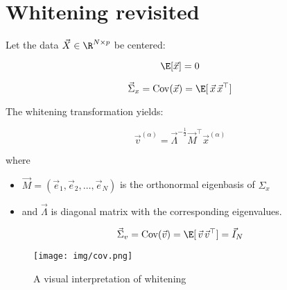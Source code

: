
\section{Whitening revisited}


\begin{frame}{\secname}


Let the data $\vec X \in \R^{N \times p}$ be centered:

\begin{equation}
\label{eq:centered}
\E \lbrack \vec x \rbrack = 0 
\end{equation}


\begin{equation}
\label{eq:cov}
\vec \Sigma_x = \mathrm{Cov}(\vec x) = \E \lbrack \, \vec x \, \vec x^\top \rbrack 
\end{equation}

The whitening transformation yields:

\begin{equation}
\label{eq:whitening}
\vec v^{(\alpha)} = \vec \Lambda^{-\frac{1}{2}} \vec M^\top \vec x^{(\alpha)}
\end{equation}

where
\begin{itemize}
\item[] $\vec M = (\vec e_1, \vec e_2, \ldots,\vec e_N)$ is the orthonormal eigenbasis of $\Sigma_x$
\item[] and $\vec\Lambda$ is diagonal matrix with the corresponding eigenvalues.
\end{itemize}

\pause


\pause


\svspace{-5mm}

\begin{equation}
\label{eq:covw}
\vec \Sigma_v = \mathrm{Cov}(\vec v) = \E \lbrack \, \vec v \, \vec v^\top \rbrack = \vec I_N
\end{equation}

\end{frame}

\begin{frame}{\secname}

\begin{figure}[ht]
\label{fig:sphering}
\texttt{[image: img/cov.png]}
\caption{A visual interpretation of whitening}
\end{figure}

\end{frame}
